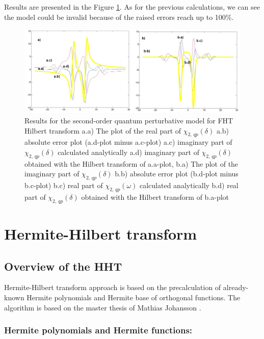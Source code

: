 \documentclass[12pt,twoside,a4paper]{article}
\numberwithin{equation}{subsection}
\numberwithin{figure}{subsection}
\begin{document}
Results are presented in the Figure \ref{fig:fht_qp2}. As for the previous calculations, we can see the model could be invalid
because of the raised errors reach up to 100\%.

\begin{figure} 
  \includegraphics[width=150mm]{img/fht_qp2.png}
  \caption{Results for the second-order quantum perturbative model for FHT Hilbert transform
     a.a) The plot of the real part of ${\chi_{2, \,qp}}(\delta )$
     a.b) absolute error plot (a.d-plot minus a.c-plot) 
     a.c) imaginary part of ${\chi_{2, \,qp}}(\delta )$ calculated analytically 
     a.d) imaginary part of ${\chi_{2, \,qp}}(\delta )$ obtained with the Hilbert transform of a.a-plot, 
     b.a) The plot of the imaginary part of ${\chi_{2, \,qp}}(\delta )$ 
     b.b) absolute error plot (b.d-plot minus b.c-plot) 
     b.c) real part of $\chi_{2, \,qp} (\omega )$ calculated analytically 
     b.d) real part of ${\chi_{2, \,qp}}(\delta )$ obtained with the Hilbert transform of b.a-plot 
     \label{fig:fht_qp2}
     }
\end{figure}

\section{Hermite-Hilbert transform} \label{chap:hermite}

\subsection{Overview of the HHT}  \label{chap:hermite_overview}

Hermite-Hilbert transform approach is based on the precalculation of already-known Hermite polynomials and Hermite base of orthogonal
functions. The algorithm is based on the master thesis of Mathias Johansson \cite{johansson_hilbert}.

\subsubsection*{Hermite polynomials and Hermite functions:}
\end{document}
